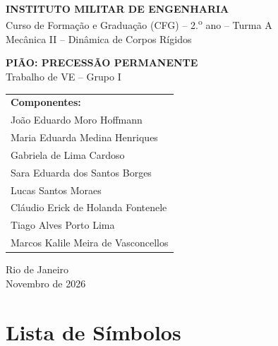 \documentclass[12pt,a4paper]{article}
\begin{document}

\begin{center}
\thispagestyle{empty}
{\large\textbf{INSTITUTO MILITAR DE ENGENHARIA}}\\[0.3cm]
{Curso de Formação e Graduação (CFG) -- 2.\textsuperscript{o} ano -- Turma A}\\[0.1cm]
{Mecânica II -- Dinâmica de Corpos Rígidos}

\vspace{3cm}

{\LARGE\textbf{PIÃO: PRECESSÃO PERMANENTE}}\\[0.5cm]
{\large Trabalho de VE -- Grupo I}

\vspace{2.5cm}

\begin{tabular}{l}
\textbf{Componentes:}\\[0.15cm]
João Eduardo Moro Hoffmann\\
Maria Eduarda Medina Henriques\\
Gabriela de Lima Cardoso\\
Sara Eduarda dos Santos Borges\\
Lucas Santos Moraes\\
Cláudio Erick de Holanda Fontenele\\
Tiago Alves Porto Lima\\
Marcos Kalile Meira de Vasconcellos
\end{tabular}

\vfill
Rio de Janeiro\\
Novembro de 2026
\end{center}
\clearpage

\tableofcontents
\clearpage

{}
\listoffigures
\clearpage

{}
\section*{Lista de Símbolos}
\end{document}
